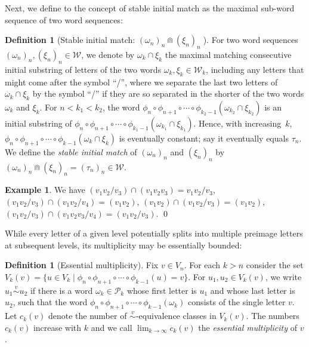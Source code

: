 \documentclass{amsart}
\theoremstyle{definition}
\newtheorem{definition}[theorem]{Definition}
\newtheorem*{Example}{Example}
\theoremstyle{remark}
\numberwithin{equation}{section}
\begin{document}
Next, we define to the concept of stable initial match as the maximal sub-word sequence of two word sequences:

\begin{definition}[Stable initial match: $(\omega_n)_n\Cap (\xi_n)_n\;$]\label{overlap}
For two word sequences $(\omega_n)_n,(\xi_n)_n\in {\mathcal W}$, we denote by $\omega_k\cap \xi_k$ the maximal matching consecutive initial substring of letters  of the two words $\omega_k, \xi_k\in {\mathcal W}_k$, including any letters that might come after the symbol ``/'', where we separate the last two letters of $\omega_k\cap \xi_k$ by the symbol ``/'' if they are so separated in the shorter of the two words $\omega_k$ and $\xi_k$. For $n<k_1<k_2$, the word $\phi_n\circ\phi_{n+1}\circ \cdots \circ \phi_{k_2-1}(\omega_{k_2}\cap \xi_{k_2})$ is an initial substring of
$\phi_n\circ\phi_{n+1}\circ \cdots \circ\phi_{k_1-1}(\omega_{k_1}\cap \xi_{k_1})$. Hence, with increasing~$k$, $\phi_n\circ\phi_{n+1}\circ \cdots\circ \phi_{k-1}(\omega_{k}\cap \xi_{k})$ is eventually constant; say it eventually equals $\tau_n$. We define the {\em stable initial match} of $(\omega_n)_n$ and $(\xi_n)_n$  by $(\omega_n)_n\Cap (\xi_n)_n=(\tau_n)_n\in {\mathcal W}$.
\end{definition}

  \begin{Example} We have  $(v_1v_2/v_3)\cap (v_1v_2v_3)=v_1v_2/v_3$, $(v_1v_2/v_3)\cap (v_1v_2/v_4)=(v_1v_2)$, $(v_1v_2)\cap( v_1v_2/v_3)=(v_1v_2)$, $(v_1v_2/v_3)\cap (v_1v_2v_3/v_4)=(v_1v_2/v_3)$. \qed
\end{Example}

While every letter of a given level potentially splits into multiple preimage letters at subsequent levels, its multiplicity may be essentially bounded:

\begin{definition}[Essential multiplicity]\label{multi} Fix $v\in V_n$. For each $k>n$ consider the set $V_k(v)=\{u\in V_k\mid \phi_n\circ \phi_{n+1}\circ\cdots\circ \phi_{k-1}(u)=v\}$.
  For $u_1, u_2\in V_k(v)$, we write $u_1\stackrel{v}{\sim} u_2$ if there is a word $\omega_k\in {\mathcal P}_k$ whose first letter is $u_1$ and whose last letter is $u_2$, such that the word $\phi_n\circ\phi_{n+1}\circ\cdots\circ\phi_{k-1}(\omega_k)$ consists of the single letter $v$. Let $c_k(v)$ denote the number of  $\stackrel{v}{\sim}$-equivalence classes in $V_k(v)$. The numbers $c_k(v)$ increase with $k$ and we call $\displaystyle \lim_{k\rightarrow \infty} c_k(v)$  the {\em  essential multiplicity} of $v$.
\end{definition}
\end{document}
